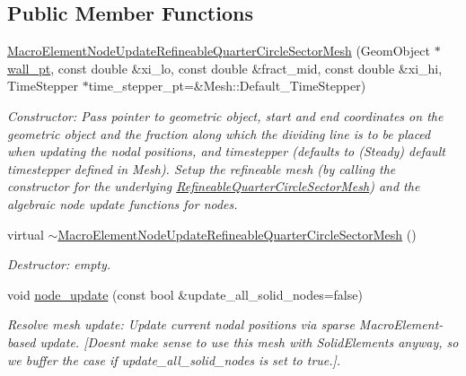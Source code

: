 \subsection*{Public Member Functions}
\begin{DoxyCompactItemize}
\item 
\hyperlink{classoomph_1_1MacroElementNodeUpdateRefineableQuarterCircleSectorMesh_ace75c8edb3d87019dc7f06152205adab}{Macro\+Element\+Node\+Update\+Refineable\+Quarter\+Circle\+Sector\+Mesh} (Geom\+Object $\ast$\hyperlink{classoomph_1_1QuarterCircleSectorMesh_a0b03071bbe7e95cc6723c221ddc0998a}{wall\+\_\+pt}, const double \&xi\+\_\+lo, const double \&fract\+\_\+mid, const double \&xi\+\_\+hi, Time\+Stepper $\ast$time\+\_\+stepper\+\_\+pt=\&Mesh\+::\+Default\+\_\+\+Time\+Stepper)
\begin{DoxyCompactList}\small\item\em Constructor\+: Pass pointer to geometric object, start and end coordinates on the geometric object and the fraction along which the dividing line is to be placed when updating the nodal positions, and timestepper (defaults to (Steady) default timestepper defined in Mesh). Setup the refineable mesh (by calling the constructor for the underlying \hyperlink{classoomph_1_1RefineableQuarterCircleSectorMesh}{Refineable\+Quarter\+Circle\+Sector\+Mesh}) and the algebraic node update functions for nodes. \end{DoxyCompactList}\item 
virtual \hyperlink{classoomph_1_1MacroElementNodeUpdateRefineableQuarterCircleSectorMesh_a2d8953d309eba614524fce77c44c8d46}{$\sim$\+Macro\+Element\+Node\+Update\+Refineable\+Quarter\+Circle\+Sector\+Mesh} ()
\begin{DoxyCompactList}\small\item\em Destructor\+: empty. \end{DoxyCompactList}\item 
void \hyperlink{classoomph_1_1MacroElementNodeUpdateRefineableQuarterCircleSectorMesh_a99403c711c3fdc2a601b478deebef9fe}{node\+\_\+update} (const bool \&update\+\_\+all\+\_\+solid\+\_\+nodes=false)
\begin{DoxyCompactList}\small\item\em Resolve mesh update\+: Update current nodal positions via sparse Macro\+Element-\/based update. \mbox{[}Doesn\textquotesingle{}t make sense to use this mesh with Solid\+Elements anyway, so we buffer the case if update\+\_\+all\+\_\+solid\+\_\+nodes is set to true.\mbox{]}. \end{DoxyCompactList}\end{DoxyCompactItemize}
